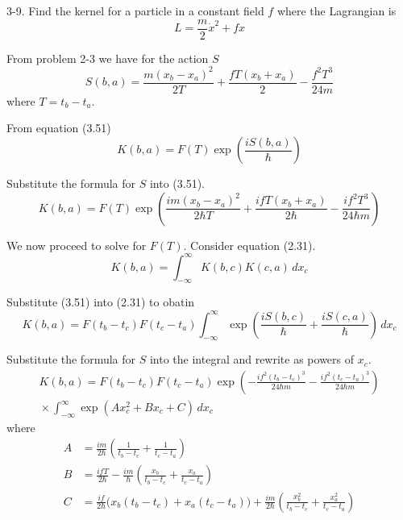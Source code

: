\documentclass[12pt]{article}
\begin{document}
3-9.
Find the kernel for a particle in a constant field $f$
where the Lagrangian is
\begin{equation*}
L=\frac{m}{2}\dot x^2+fx
\end{equation*}

From problem 2-3 we have for the action $S$
\begin{equation*}
S(b,a)=\frac{m(x_b-x_a)^2}{2T}+\frac{fT(x_b+x_a)}{2}-\frac{f^2T^3}{24m}
\end{equation*}
where $T=t_b-t_a$.

\bigskip
From equation (3.51)
\begin{equation*}
K(b,a)=F(T)\exp\left(\frac{iS(b,a)}{\hbar}\right)
\tag{3.51}
\end{equation*}

Substitute the formula for $S$ into (3.51).
\begin{equation*}
K(b,a)=
F(T)\exp\left(
\frac{im(x_b-x_a)^2}{2\hbar T}
+\frac{ifT(x_b+x_a)}{2\hbar}
-\frac{if^2T^3}{24\hbar m}
\right)
\tag{1}
\end{equation*}

We now proceed to solve for $F(T)$.
Consider equation (2.31).
\begin{equation*}
K(b,a)=\int_{-\infty}^\infty K(b,c)K(c,a)\,dx_c
\tag{2.31}
\end{equation*}

Substitute (3.51) into (2.31) to obatin
\begin{equation*}
K(b,a)=F(t_b-t_c)F(t_c-t_a)\int_{-\infty}^\infty
\exp\left(\frac{iS(b,c)}{\hbar}+\frac{iS(c,a)}{\hbar}\right)
\,dx_c
\end{equation*}

Substitute the formula for $S$ into the integral
and rewrite as powers of $x_c$.
\begin{multline*}
K(b,a)=F(t_b-t_c)F(t_c-t_a)
\exp\left(-\frac{if^2(t_b-t_c)^3}{24\hbar m}-\frac{if^2(t_c-t_a)^3}{24\hbar m}\right)
\\[1ex]
{}\times
\int_{-\infty}^\infty
\exp\left(Ax_c^2+Bx_c+C\right)
\,dx_c
\tag{2}
\end{multline*}
where
\begin{align*}
A&=\frac{im}{2\hbar}\left(\frac{1}{t_b-t_c}+\frac{1}{t_c-t_a}\right)
\tag{3}
\\
B&=\frac{ifT}{2\hbar}-\frac{im}{\hbar}\left(\frac{x_b}{t_b-t_c}+\frac{x_a}{t_c-t_a}\right)
\tag{4}
\\
C&=\frac{if}{2\hbar}\big(x_b(t_b-t_c)+x_a(t_c-t_a)\big)+\frac{im}{2\hbar}
\left(\frac{x_b^2}{t_b-t_c}+\frac{x_a^2}{t_c-t_a}\right)
\tag{5}
\end{align*}
\end{document}
